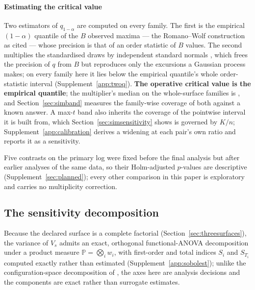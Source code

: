 \paragraph{Estimating the critical value}
Two estimators of $q_{1-\alpha}$ are computed on every family. The first is
the empirical $(1-\alpha)$ quantile of the $B$ observed maxima --- the
Romano--Wolf construction as cited --- whose precision is that of an order
statistic of $B$ values. The second multiplies the standardised draws by
independent standard normals \citep{chernozhukov2013gaussian}, which frees
the precision of $q$ from $B$ but reproduces only the excursions a Gaussian
process makes; on every family here it lies below the empirical quantile's
whole order-statistic interval (Supplement~\ref{app:twoq}). \textbf{The
operative critical value is the empirical quantile}; the multiplier's median
on the whole-surface families is \maxTSurfaceMultMedian, and
Section~\ref{sec:simband} measures the family-wise coverage of both against a
known answer. A max-$t$ band also inherits the coverage of the pointwise
interval it is built from, which Section~\ref{sec:simsensitivity} shows is
governed by $K/n$; Supplement~\ref{app:calibration} derives a widening at
each pair's own ratio and reports it as a sensitivity.

Five contrasts on the primary log were fixed before the final analysis but
after earlier analyses of the same data, so their Holm-adjusted $p$-values
are descriptive (Supplement~\ref{sec:planned}); every other comparison in
this paper is exploratory and carries no multiplicity correction.

\subsection{The sensitivity decomposition}
\label{sec:sobol}

Because the declared surface is a complete factorial
(Section~\ref{sec:threesurfaces}), the variance of $V_s$ admits an exact,
orthogonal functional-ANOVA decomposition
\citep{sobol2001global,saltelli2010variance} under a product measure
$\mathbb{P} = \bigotimes_i w_i$, with first-order and total indices $S_i$ and
$S_{T_i}$ computed exactly rather than estimated
(Supplement~\ref{app:sobolest}); unlike the configuration-space
decomposition of \citet{hutter2014efficient}, the axes here are analysis
decisions and the components are exact rather than surrogate estimates.

